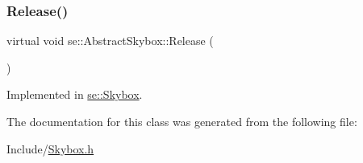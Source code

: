 \subsubsection{\texorpdfstring{Release()}{Release()}}
{\footnotesize\ttfamily virtual void se\+::\+Abstract\+Skybox\+::\+Release (\begin{DoxyParamCaption}{ }\end{DoxyParamCaption})\hspace{0.3cm}{\ttfamily [pure virtual]}}



Implemented in \mbox{\hyperlink{classse_1_1_skybox_ad9a6b80274236240aba6eaafaf7d2e9c}{se\+::\+Skybox}}.



The documentation for this class was generated from the following file\+:\begin{DoxyCompactItemize}
\item 
Include/\mbox{\hyperlink{_skybox_8h}{Skybox.\+h}}\end{DoxyCompactItemize}
